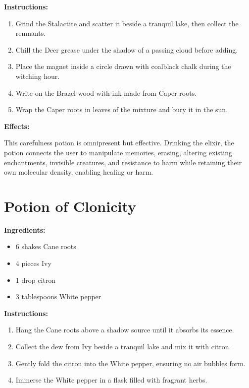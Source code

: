 \documentclass{article}
\begin{document}
\textbf{Instructions:}

\begin{enumerate}
  \item Grind the Stalactite and scatter it beside a tranquil lake, then collect the remnants.
  \item Chill the Deer grease under the shadow of a passing cloud before adding.
  \item Place the magnet inside a circle drawn with coalblack chalk during the witching hour.
  \item Write on the Brazel wood with ink made from Caper roots.
  \item Wrap the Caper roots in leaves of the mixture and bury it in the sun.
\end{enumerate}

\textbf{Effects:}

This carefulness potion is omnipresent but effective. Drinking the elixir, the potion connects the user to manipulate memories, erasing, altering existing enchantments, invisible creatures, and resistance to harm while retaining their own molecular density, enabling healing or harm.

\newpage
\section*{Potion of Clonicity}

\textbf{Ingredients:}

\begin{itemize}
  \item 6 shakes Cane roots
  \item 4 pieces Ivy
  \item 1 drop citron
  \item 3 tablespoons White pepper
\end{itemize}

\textbf{Instructions:}

\begin{enumerate}
  \item Hang the Cane roots above a shadow source until it absorbs its essence.
  \item Collect the dew from Ivy beside a tranquil lake and mix it with citron.
  \item Gently fold the citron into the White pepper, ensuring no air bubbles form.
  \item Immerse the White pepper in a flask filled with fragrant herbs.
\end{enumerate}
\end{document}
